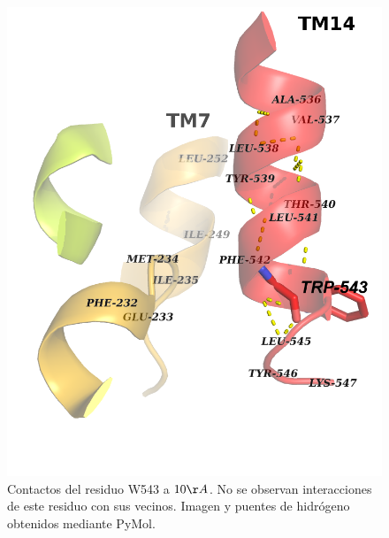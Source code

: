 \begin{figure}[h]
 \centering
 \includegraphics[scale=0.18]{Kap4/W543_label.png}
 \caption{Contactos del residuo W543 a $10\AA$. No se observan interacciones de este residuo con sus vecinos. Imagen y puentes de hidr\'{o}geno obtenidos mediante PyMol.}
 \label{fig:W543}
\end{figure}

